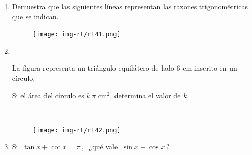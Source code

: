 \vspace{5mm}
\begin{enumerate}


\item	Demuestra que las siguientes líneas representan las razones trigonométricas que se indican.

\begin{figure}[H]
	\centering
	\texttt{[image: img-rt/rt41.png]}
\end{figure}

\vspace{-6mm}
\begin{flushright}
\begin{footnotesize} \textcolor{gris}{}	\end{footnotesize}
\end{flushright}

\item	

\begin{multicols}{2}
$\quad$

La figura representa un triángulo equilátero de lado $6$ cm inscrito en un círculo. 

Si el área del círculo es $k\, \pi$ cm$^2$, determina el valor de $k$.

$\quad$
\begin{figure}[H]
	\centering
	\texttt{[image: img-rt/rt42.png]}
\end{figure}
	
\end{multicols}


\vspace{-6mm}
\begin{flushright}
\begin{footnotesize} \textcolor{gris}{}	\end{footnotesize}
\end{flushright}

\item	Si $\ \tan x+\cot x=\pi\, , \ $ ¿qué vale $\ \sin x+\cos x \, $? 

\vspace{-6mm}
\begin{flushright}
\begin{footnotesize} \textcolor{gris}{}	\end{footnotesize}
\end{flushright}


\end{enumerate}
